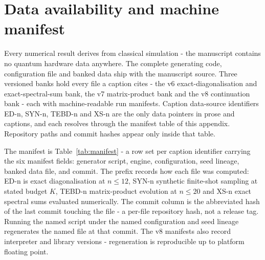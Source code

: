 \section{Data availability and machine manifest}\label{app:NA2}

Every numerical result derives from classical simulation - the manuscript contains no quantum hardware data anywhere. The complete generating code, configuration file and banked data ship with the manuscript source. Three versioned banks hold every file a caption cites - the v6 exact-diagonalisation and exact-spectral-sum bank, the v7 matrix-product bank and the v8 continuation bank - each with machine-readable run manifests. Caption data-source identifiers ED-n, SYN-n, TEBD-n and XS-n are the only data pointers in prose and captions, and each resolves through the manifest table of this appendix. Repository paths and commit hashes appear only inside that table.

The manifest is Table~\ref{tab:manifest} - a row set per caption identifier carrying the six manifest fields: generator script, engine, configuration, seed lineage, banked data file, and commit. The prefix records how each file was computed: ED-n is exact diagonalisation at $n \le 12$, SYN-n synthetic finite-shot sampling at stated budget $K$, TEBD-n matrix-product evolution at $n \le 20$ and XS-n exact spectral sums evaluated numerically. The commit column is the abbreviated hash of the last commit touching the file - a per-file repository hash, not a release tag. Running the named script under the named configuration and seed lineage regenerates the named file at that commit. The v8 manifests also record interpreter and library versions - regeneration is reproducible up to platform floating point.

